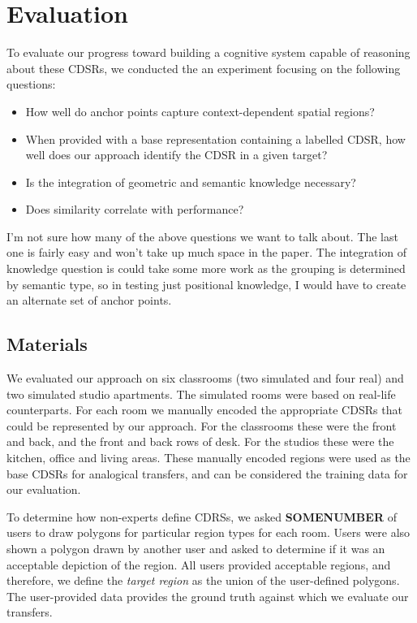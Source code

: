 \section{Evaluation}\label{sec:evaluation}

To evaluate our progress toward building a cognitive system capable of reasoning about these CDSRs, we conducted the an experiment focusing on the following questions:
\begin{itemize}
\item{How well do anchor points capture context-dependent spatial regions?}
\item{When provided with a base representation containing a labelled CDSR, how well does our approach identify the CDSR in a given target?}
\item{Is the integration of geometric and semantic knowledge necessary?}
\item{Does similarity correlate with performance?}
\end{itemize}

I'm not sure how many of the above questions we want to talk about. The last one is fairly easy and won't take up much space in the paper. The integration of knowledge question is could take some more work as the grouping is determined by semantic type, so in testing just positional knowledge,  I would have to create an alternate set of anchor points.

\subsection{Materials}

We evaluated our approach on six classrooms (two simulated and four real) and two simulated studio apartments. The simulated rooms were based on real-life counterparts. For each room we manually encoded the appropriate CDSRs that could be represented by our approach. For the classrooms these were the front and back, and the front and back rows of desk. For the studios these were the kitchen, office and living areas. These manually encoded regions were used as the base CDSRs for analogical transfers, and can be considered the training data for our evaluation. 

To determine how non-experts define CDRSs, we asked \textbf{SOMENUMBER} of users to draw polygons for particular region types for each room. Users were also shown a polygon drawn by another user and asked to determine if it was an acceptable depiction of the region. All users provided acceptable regions, and therefore, we define the \textit{target region} as the union of the user-defined polygons. The user-provided data provides the ground truth against which we evaluate our transfers.

